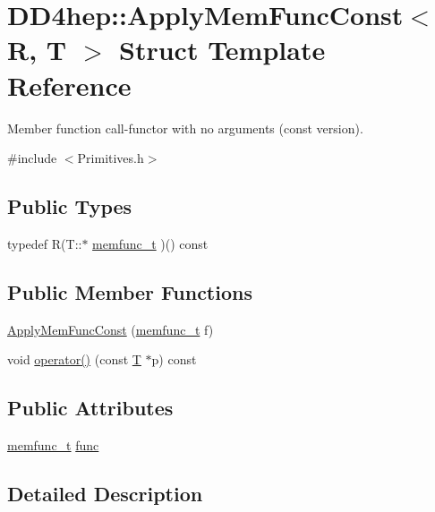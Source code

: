 \hypertarget{struct_d_d4hep_1_1_apply_mem_func_const}{
\section{DD4hep::ApplyMemFuncConst$<$ R, T $>$ Struct Template Reference}
\label{struct_d_d4hep_1_1_apply_mem_func_const}
}


Member function call-\/functor with no arguments (const version).  


{\ttfamily \#include $<$Primitives.h$>$}\subsection*{Public Types}
\begin{DoxyCompactItemize}
\item 
typedef R(T::$\ast$ \hyperlink{struct_d_d4hep_1_1_apply_mem_func_const_a542399152360e169bbbca81a4de7c69b}{memfunc\_\-t} )() const 
\end{DoxyCompactItemize}
\subsection*{Public Member Functions}
\begin{DoxyCompactItemize}
\item 
\hyperlink{struct_d_d4hep_1_1_apply_mem_func_const_a2ced0eb9c81ba9bb827054c2afc42961}{ApplyMemFuncConst} (\hyperlink{struct_d_d4hep_1_1_apply_mem_func_const_a542399152360e169bbbca81a4de7c69b}{memfunc\_\-t} f)
\item 
void \hyperlink{struct_d_d4hep_1_1_apply_mem_func_const_a9d8f199e5ea2cbd32aea36848e6707f9}{operator()} (const \hyperlink{class_t}{T} $\ast$p) const 
\end{DoxyCompactItemize}
\subsection*{Public Attributes}
\begin{DoxyCompactItemize}
\item 
\hyperlink{struct_d_d4hep_1_1_apply_mem_func_const_a542399152360e169bbbca81a4de7c69b}{memfunc\_\-t} \hyperlink{struct_d_d4hep_1_1_apply_mem_func_const_a667382c86c9164ebeb9ff332d34d082a}{func}
\end{DoxyCompactItemize}


\subsection{Detailed Description}
